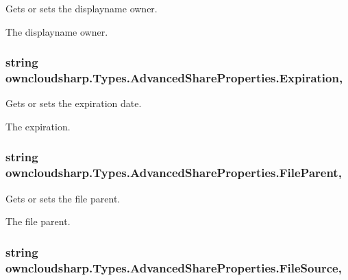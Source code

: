 Gets or sets the displayname owner. 

The displayname owner.\hypertarget{classowncloudsharp_1_1_types_1_1_advanced_share_properties_a8a86e701a2c7a7b0f1c680698ddca880}{}
\subsubsection[{Expiration}]{\setlength{\rightskip}{0pt plus 5cm}string owncloudsharp.\+Types.\+Advanced\+Share\+Properties.\+Expiration\hspace{0.3cm}{\ttfamily [get]}, {\ttfamily [set]}}\label{classowncloudsharp_1_1_types_1_1_advanced_share_properties_a8a86e701a2c7a7b0f1c680698ddca880}


Gets or sets the expiration date. 

The expiration.\hypertarget{classowncloudsharp_1_1_types_1_1_advanced_share_properties_a2c4e5bdae35155b9bce9f0aa02ca0de2}{}
\subsubsection[{File\+Parent}]{\setlength{\rightskip}{0pt plus 5cm}string owncloudsharp.\+Types.\+Advanced\+Share\+Properties.\+File\+Parent\hspace{0.3cm}{\ttfamily [get]}, {\ttfamily [set]}}\label{classowncloudsharp_1_1_types_1_1_advanced_share_properties_a2c4e5bdae35155b9bce9f0aa02ca0de2}


Gets or sets the file parent. 

The file parent.\hypertarget{classowncloudsharp_1_1_types_1_1_advanced_share_properties_a7a636c605e2eeda78dfad180f75f9b4b}{}
\subsubsection[{File\+Source}]{\setlength{\rightskip}{0pt plus 5cm}string owncloudsharp.\+Types.\+Advanced\+Share\+Properties.\+File\+Source\hspace{0.3cm}{\ttfamily [get]}, {\ttfamily [set]}}\label{classowncloudsharp_1_1_types_1_1_advanced_share_properties_a7a636c605e2eeda78dfad180f75f9b4b}


